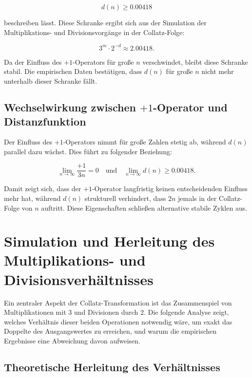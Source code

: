 \documentclass[a4paper,12pt]{article}
\begin{document}
\begin{equation} 
    d(n) \geq 0.00418
\end{equation}

beschreiben lässt. Diese Schranke ergibt sich aus der Simulation der Multiplikations- und Divisionsvorgänge in der Collatz-Folge:

\begin{equation}
    3^m \cdot 2^{-d} \approx 2.00418.
\end{equation}

Da der Einfluss des \( +1 \)-Operators für große \( n \) verschwindet, bleibt diese Schranke stabil. Die empirischen Daten bestätigen, dass \( d(n) \) für große \( n \) nicht mehr unterhalb dieser Schranke fällt.

\subsection{Wechselwirkung zwischen \( +1 \)-Operator und Distanzfunktion}

Der Einfluss des \( +1 \)-Operators nimmt für große Zahlen stetig ab, während \( d(n) \) parallel dazu wächst. Dies führt zu folgender Beziehung:

\begin{equation} 
    \lim_{n \to \infty} \frac{+1}{3n} = 0 \quad \text{und} \quad \lim_{n \to \infty} d(n) \geq 0.00418.
\end{equation}

Damit zeigt sich, dass der \( +1 \)-Operator langfristig keinen entscheidenden Einfluss mehr hat, während \( d(n) \) strukturell verhindert, dass \( 2n \) jemals in der Collatz-Folge von \( n \) auftritt. Diese Eigenschaften schließen alternative stabile Zyklen aus.



\section{Simulation und Herleitung des Multiplikations- und Divisionsverhältnisses}  

Ein zentraler Aspekt der Collatz-Transformation ist das Zusammenspiel von Multiplikationen mit 3 und Divisionen durch 2. Die folgende Analyse zeigt, welches Verhältnis dieser beiden Operationen notwendig wäre, um exakt das Doppelte des Ausgangswertes zu erreichen, und warum die empirischen Ergebnisse eine Abweichung davon aufweisen.  

\subsection{Theoretische Herleitung des Verhältnisses}  
\end{document}
